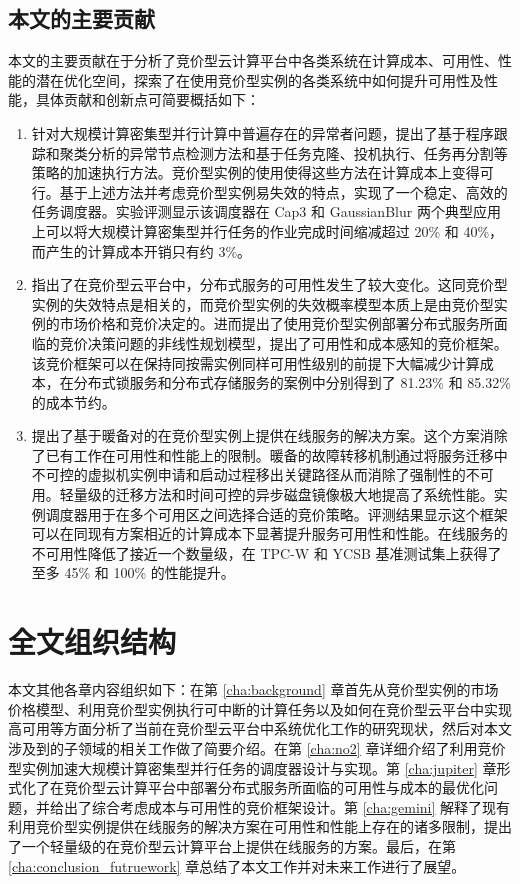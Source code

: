 \subsection{本文的主要贡献}
本文的主要贡献在于分析了竞价型云计算平台中各类系统在计算成本、可用性、性能的潜在优化空间，探索了在使用竞价型实例的各类系统中如何提升可用性及性能，具体贡献和创新点可简要概括如下：
\begin{enumerate}
\item 针对大规模计算密集型并行计算中普遍存在的异常者问题，提出了基于程序跟踪和聚类分析的异常节点检测方法和基于任务克隆、投机执行、任务再分割等策略的加速执行方法。竞价型实例的使用使得这些方法在计算成本上变得可行。基于上述方法并考虑竞价型实例易失效的特点，实现了一个稳定、高效的任务调度器。实验评测显示该调度器在 Cap3 和 GaussianBlur 两个典型应用上可以将大规模计算密集型并行任务的作业完成时间缩减超过 20\% 和 40\%，而产生的计算成本开销只有约 3\%。
\item 指出了在竞价型云平台中，分布式服务的可用性发生了较大变化。这同竞价型实例的失效特点是相关的，而竞价型实例的失效概率模型本质上是由竞价型实例的市场价格和竞价决定的。进而提出了使用竞价型实例部署分布式服务所面临的竞价决策问题的非线性规划模型，提出了可用性和成本感知的竞价框架。该竞价框架可以在保持同按需实例同样可用性级别的前提下大幅减少计算成本，在分布式锁服务和分布式存储服务的案例中分别得到了 81.23\% 和 85.32\% 的成本节约。
\item 提出了基于暖备对的在竞价型实例上提供在线服务的解决方案。这个方案消除了已有工作在可用性和性能上的限制。暖备的故障转移机制通过将服务迁移中不可控的虚拟机实例申请和启动过程移出关键路径从而消除了强制性的不可用。轻量级的迁移方法和时间可控的异步磁盘镜像极大地提高了系统性能。实例调度器用于在多个可用区之间选择合适的竞价策略。评测结果显示这个框架可以在同现有方案相近的计算成本下显著提升服务可用性和性能。在线服务的不可用性降低了接近一个数量级，在 TPC-W 和 YCSB 基准测试集上获得了至多 45\% 和 100\% 的性能提升。
\end{enumerate}

\section{全文组织结构}
本文其他各章内容组织如下：在第 \ref{cha:background} 章首先从竞价型实例的市场价格模型、利用竞价型实例执行可中断的计算任务以及如何在竞价型云平台中实现高可用等方面分析了当前在竞价型云平台中系统优化工作的研究现状，然后对本文涉及到的子领域的相关工作做了简要介绍。在第 \ref{cha:no2} 章详细介绍了利用竞价型实例加速大规模计算密集型并行任务的调度器设计与实现。第 \ref{cha:jupiter} 章形式化了在竞价型云计算平台中部署分布式服务所面临的可用性与成本的最优化问题，并给出了综合考虑成本与可用性的竞价框架设计。第 \ref{cha:gemini} 解释了现有利用竞价型实例提供在线服务的解决方案在可用性和性能上存在的诸多限制，提出了一个轻量级的在竞价型云计算平台上提供在线服务的方案。最后，在第 
\ref{cha:conclusion_futruework} 章总结了本文工作并对未来工作进行了展望。
